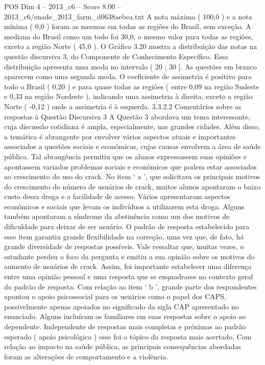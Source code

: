 \begin{textsample}{POS Dim 4 – 2013\_c6 – Score 8.00 – 2013\_c6/enade\_2013\_farm\_d0638aebea.txt}
A nota máxima ( 100,0 ) e a nota mínima ( 0,0 ) foram as mesmas em todas as regiões do Brasil, sem exceção.
A mediana do Brasil como um todo foi 30,0, o mesmo valor para todas as regiões, exceto a região Norte ( 45,0 ).
O Gráfico 3.20 mostra a distribuição das notas na questão discursiva 3, do Componente de Conhecimento Específico.
Essa distribuição apresenta uma moda no intervalo ( 20 ; 30 ].
As questões em branco aparecem como uma segunda moda.
O coeficiente de assimetria é positivo para todo o Brasil ( 0,20 ) e para quase todas as regiões ( entre 0,09 na região Sudeste e 0,33 na região Nordeste ), indicando uma assimetria à direita, exceto a região Norte ( -0,12 ) onde a assimetria é à esquerda. 3.3.2.2 Comentários sobre as respostas à Questão Discursiva 3 A Questão 3 abordava um tema interessante, cuja discussão cotidiana é ampla, especialmente, nas grandes cidades.
Além disso, a temática é abrangente por envolver vários aspectos atuais e importantes associados a questões sociais e econômicas, cujas causas envolvem a área de saúde pública.
Tal abrangência permitiu que os alunos expressassem suas opiniões e apontassem variados problemas sociais e econômicos que podem estar associados ao crescimento do uso do crack.
No item ‘ a ’, que solicitava os principais motivos do crescimento do número de usuários de crack, muitos alunos apontaram o baixo custo dessa droga e a facilidade de acesso.
Vários apresentaram aspectos econômicos e sociais que levam os indivíduos a utilizarem esta droga.
Alguns também apontaram a síndrome da abstinência como um dos motivos de dificuldade para deixar de ser usuário.
O padrão de resposta estabelecido para esse item garantiu grande flexibilidade na correção, uma vez que, de fato, há grande diversidade de respostas possíveis.
Vale ressaltar que, muitas vezes, o estudante perdeu o foco da pergunta e emitiu a sua opinião sobre os motivos do aumento de usuários de crack.
Assim, foi importante estabelecer uma diferença entre uma opinião pessoal e uma resposta que se enquadrasse no contexto geral do padrão de resposta.
Com relação ao item ‘ b ’, grande parte dos respondentes apontou o apoio psicossocial para os usuários como o papel dos CAPS, possivelmente apenas apoiados no significado da sigla CAP apresentado no enunciado.
Alguns incluíram os familiares em suas respostas sobre o apoio ao dependente.
Independente de respostas mais completas e próximas ao padrão esperado ( apoio psicológico ) esse foi o tópico da resposta mais acertado.
Com relação ao impacto na saúde pública, as principais consequências abordadas foram as alterações de comportamento e a violência.

\end{textsample}
